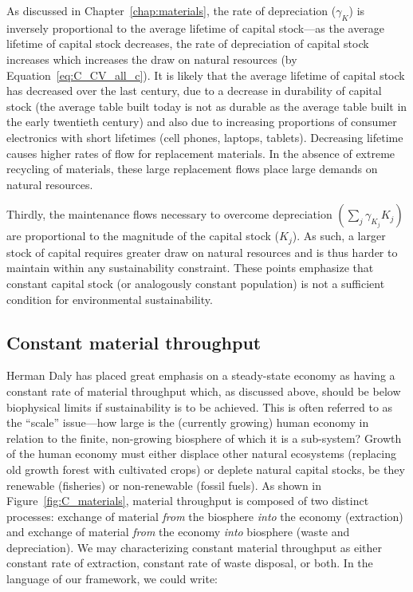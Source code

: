 As discussed in Chapter~\ref{chap:materials},
the rate of depreciation ($\gamma_{K}$) is inversely
proportional to the average lifetime of capital stock---as
the average lifetime of capital stock decreases,
the rate of depreciation of capital stock increases which
increases the draw on natural resources (by Equation~\ref{eq:C_CV_all_c}).
It is likely that the average lifetime of capital stock has
decreased over the last century, 
due to a decrease in durability of capital stock
(the average table built today is not as durable as the average table
built in the early twentieth century)
and also due to increasing proportions of consumer electronics
with short lifetimes (cell phones, laptops, tablets).
Decreasing lifetime causes higher rates of flow for
replacement materials.
In the absence of extreme recycling of materials,
these large replacement flows place large demands on
natural resources.

Thirdly,
the maintenance flows necessary to overcome
depreciation
$\left(\sum_{j}\gamma_{K_{j}}K_{j}\right)$
are proportional to the magnitude of the capital
stock ($K_{j}$).
As such,
a larger stock of capital requires
greater draw on natural resources and is thus harder
to maintain within any sustainability constraint.
These points emphasize that constant capital stock
(or analogously constant population)
is not a sufficient condition for environmental sustainability.


\subsection{Constant material throughput}

Herman Daly has placed great emphasis on a steady-state
economy as having a constant rate of material throughput 
\cite{Daly1977, Daly1997}
which, as discussed above, should be below biophysical limits
if sustainability is to be achieved.
This is often referred to as the ``scale'' issue---how 
large is the (currently growing) human economy in relation
to the finite, non-growing biosphere of which it is a sub-system?
Growth of the human economy must either displace other natural
ecosystems (replacing old growth forest with cultivated crops)
or deplete natural capital stocks, be they 
renewable (fisheries) or 
non-renewable (fossil fuels).
As shown in Figure~\ref{fig:C_materials},
material throughput is composed of two distinct processes:
exchange of material \emph{from} the biosphere 
\emph{into} the economy (extraction)
and exchange of material \emph{from} the economy
\emph{into} biosphere (waste and depreciation).
We may characterizing constant material throughput
as either constant rate of extraction, constant rate of
waste disposal, or both.
In the language of our framework, we could write:

